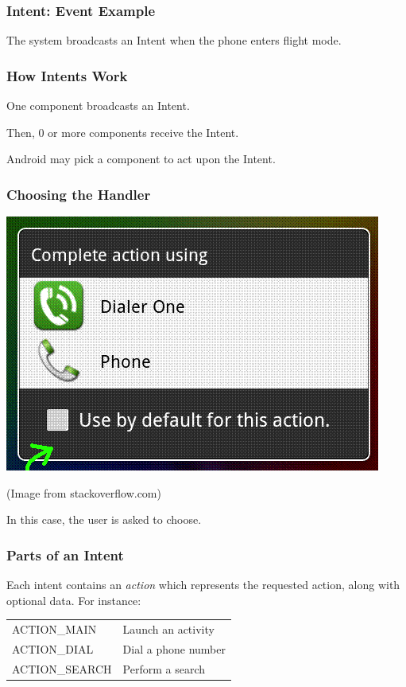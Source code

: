 \begin{frame}
\frametitle{Intent: Event Example}
\begin{changemargin}{.8cm}

The system broadcasts an Intent when the phone
enters flight mode.

\end{changemargin}
\end{frame}

\begin{frame}
\frametitle{How Intents Work}
\begin{changemargin}{1cm}
 One component broadcasts an Intent. 

Then, 0 or more components receive the Intent. 

Android may pick a component
to act upon the Intent.

\end{changemargin}
\end{frame}

\begin{frame}
\frametitle{Choosing the Handler}
\begin{changemargin}{1cm}
\begin{center}
\includegraphics[height=.5\textheight]{images/completeaction.png}
\end{center}
(Image from stackoverflow.com)

In this case, the user is asked to choose.

\end{changemargin}
\end{frame}


\begin{frame}
\frametitle{Parts of an Intent}
\begin{changemargin}{1cm}

Each intent contains an \emph{action} which represents the requested
action, along with optional data. For instance:

\hspace*{2em} \begin{tabular}{ll}
ACTION\_MAIN & Launch an activity \\
ACTION\_DIAL & Dial a phone number \\
ACTION\_SEARCH & Perform a search
\end{tabular}

\end{changemargin}
\end{frame}


